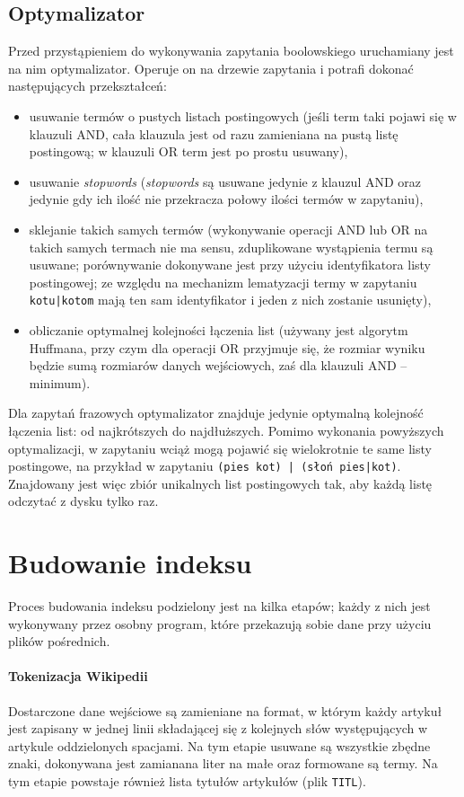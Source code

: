 \documentclass[a4paper,12pt]{article}
\begin{document}
\subsection{Optymalizator}
Przed przystąpieniem do wykonywania zapytania boolowskiego uruchamiany jest
na nim optymalizator. Operuje on na drzewie zapytania i potrafi dokonać
następujących przekształceń:
\begin{itemize}
 \item usuwanie termów o pustych listach postingowych (jeśli term taki
 pojawi się w klauzuli AND, cała klauzula jest od razu zamieniana na
 pustą listę postingową; w klauzuli OR term jest po prostu usuwany),
 \item usuwanie \textit{stopwords} (\textit{stopwords} są usuwane jedynie
 z klauzul AND oraz jedynie gdy ich ilość nie przekracza połowy ilości
 termów w zapytaniu),
 \item sklejanie takich samych termów (wykonywanie operacji AND lub
 OR na takich samych termach nie ma sensu, zduplikowane wystąpienia 
 termu są usuwane; porównywanie dokonywane jest przy użyciu identyfikatora
 listy postingowej; ze względu na mechanizm lematyzacji termy w zapytaniu
 \texttt{kotu|kotom} mają ten sam identyfikator i jeden z nich zostanie
 usunięty),
 \item obliczanie optymalnej kolejności łączenia list (używany jest
 algorytm Huffmana, przy czym dla operacji OR przyjmuje się, że
 rozmiar wyniku będzie sumą rozmiarów danych wejściowych, zaś dla
 klauzuli AND -- minimum).
\end{itemize}
Dla zapytań frazowych optymalizator znajduje jedynie optymalną kolejność
łączenia list: od najkrótszych do najdłuższych.
Pomimo wykonania powyższych optymalizacji, w zapytaniu wciąż mogą pojawić
się wielokrotnie te same listy postingowe, na przykład w zapytaniu
\texttt{(pies kot) | (słoń pies|kot)}. Znajdowany jest więc zbiór
unikalnych list postingowych tak, aby każdą listę odczytać z dysku
tylko raz.

\section{Budowanie indeksu}
Proces budowania indeksu podzielony jest na kilka etapów; każdy z nich jest
wykonywany przez osobny program, które przekazują sobie dane przy użyciu plików
pośrednich.

\paragraph{Tokenizacja Wikipedii} Dostarczone dane wejściowe są zamieniane
na format, w którym każdy artykuł jest zapisany w jednej linii składającej się
z kolejnych słów występujących w artykule oddzielonych spacjami. Na tym etapie
usuwane są wszystkie zbędne znaki, dokonywana jest zamianana liter na małe
oraz formowane są termy. Na tym etapie powstaje również lista tytułów
artykułów (plik \texttt{TITL}).
\end{document}
